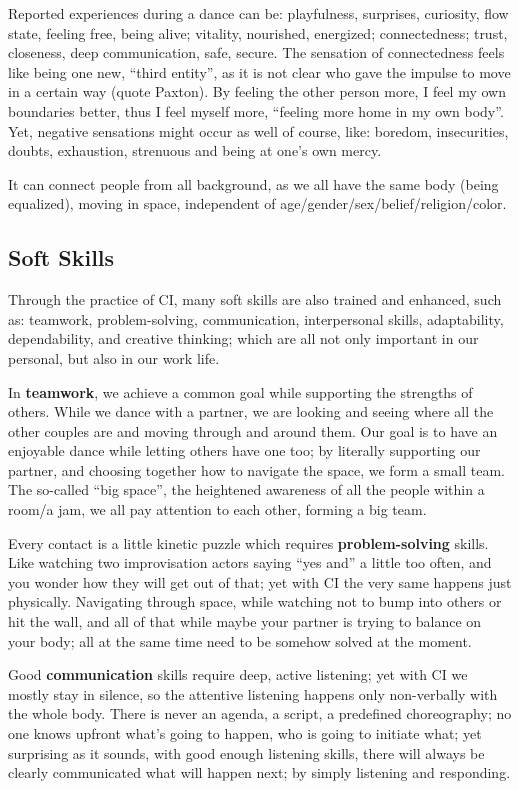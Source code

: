 Reported experiences during a dance can be: playfulness, surprises, curiosity, flow state, feeling free, being alive; vitality, nourished, energized; connectedness; trust, closeness, deep communication, safe, secure.
The sensation of connectedness feels like being one new, ``third entity'', as it is not clear who gave the impulse to move in a certain way (quote Paxton).
By feeling the other person more, I feel my own boundaries better, thus I feel myself more, ``feeling more home in my own body''.
Yet, negative sensations might occur as well of course, like: boredom, insecurities, doubts, exhaustion, strenuous and being at one's own mercy.

It can connect people from all background, as we all have the same body (being equalized), moving in space, independent of age/gender/sex/belief/religion/color.

\subsection{Soft Skills}\label{subsec:soft-skills}

Through the practice of CI, many soft skills are also trained and enhanced, such as: teamwork, problem-solving, communication, interpersonal skills, adaptability, dependability, and creative thinking; which are all not only important in our personal, but also in our work life.

In \textbf{teamwork}, we achieve a common goal while supporting the strengths of others.
While we dance with a partner, we are looking and seeing where all the other couples are and moving through and around them.
Our goal is to have an enjoyable dance while letting others have one too; by literally supporting our partner, and choosing together how to navigate the space, we form a small team.
The so-called ``big space'', the heightened awareness of all the people within a room/a jam, we all pay attention to each other, forming a big team.

Every contact is a little kinetic puzzle which requires \textbf{problem-solving} skills.
Like watching two improvisation actors saying ``yes and'' a little too often, and you wonder how they will get out of that; yet with CI the very same happens just physically.
Navigating through space, while watching not to bump into others or hit the wall, and all of that while maybe your partner is trying to balance on your body; all at the same time need to be somehow solved at the moment.

Good \textbf{communication} skills require deep, active listening; yet with CI we mostly stay in silence, so the attentive listening happens only non-verbally with the whole body.
There is never an agenda, a script, a predefined choreography; no one knows upfront what's going to happen, who is going to initiate what; yet surprising as it sounds, with good enough listening skills, there will always be clearly communicated what will happen next; by simply listening and responding.

